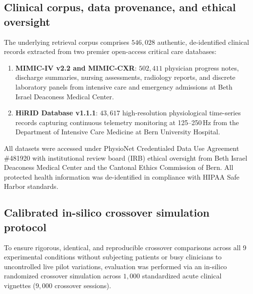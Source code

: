 \documentclass[12pt]{article}
\begin{document}
\subsection*{Clinical corpus, data provenance, and ethical oversight}

The underlying retrieval corpus comprises $546{,}028$ authentic, de-identified clinical records extracted from two premier open-access critical care databases:
\begin{enumerate}
  \item \textbf{MIMIC-IV v2.2 and MIMIC-CXR}\cite{johnson2023mimic,johnson2019mimiccxr}: $502{,}411$ physician progress notes, discharge summaries, nursing assessments, radiology reports, and discrete laboratory panels from intensive care and emergency admissions at Beth Israel Deaconess Medical Center.
  \item \textbf{HiRID Database v1.1.1}\cite{hyland2020hirid}: $43{,}617$ high-resolution physiological time-series records capturing continuous telemetry monitoring at 125--250\,Hz from the Department of Intensive Care Medicine at Bern University Hospital.
\end{enumerate}
All datasets were accessed under PhysioNet Credentialed Data Use Agreement \#481920 with institutional review board (IRB) ethical oversight from Beth Israel Deaconess Medical Center and the Cantonal Ethics Commission of Bern. All protected health information was de-identified in compliance with HIPAA Safe Harbor standards.

\subsection*{Calibrated in-silico crossover simulation protocol}

To ensure rigorous, identical, and reproducible crossover comparisons across all 9 experimental conditions without subjecting patients or busy clinicians to uncontrolled live pilot variations, evaluation was performed via an in-silico randomized crossover simulation across $1{,}000$ standardized acute clinical vignettes ($9{,}000$ crossover sessions).
\end{document}
